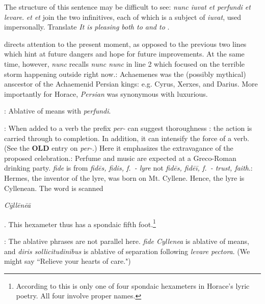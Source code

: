
The structure of this sentence may be difficult to see: \textit{nunc iuvat et perfundi et levare}.  \textit{et \lips et} join the two infinitives, each of which is a subject of \textit{iuvat}, used impersonally.  Translate \textit{It is pleasing both to \lips and to \lips}.


 directs attention to the present moment, as opposed to the previous two lines which hint at future dangers and hope for future improvements.  At the same time, however, \textit{nunc} recalls \textit{nunc \lips nunc} in line 2 which focused on the terrible storm happening outside right now.\indent{}: Achaemenes was the (possibly mythical) anscestor of the Achaemenid Persian kings: e.g. Cyrus, Xerxes, and Darius.  More importantly for Horace, \textit{Persian} was synonymous with luxurious.


: Ablative of means with \textit{perfundi}.


: When added to a verb the prefix \textit{per-} can suggest thoroughness : the action is carried through to completion.  In addition, it can intensify the force of a verb.  (See the \textbf{OLD} entry on \textit{per-}.)  Here it emphasizes the extravagance of the proposed celebration.\indent{}: Perfume and music are expected at a Greco-Roman drinking party.  \textit{fide} is from \textit{fidēs, fidis, f.\ - lyre} not  \textit{fidēs, fidēī, f.\ - trust, faith}.\indent{}:  Hermes, the inventor of the lyre, was born on Mt. Cyllene.  Hence, the lyre is Cyllenean.  The word is scanned \begin{metrica}\textit{C\=yll\=en\=e\=a}\end{metrica}.  This hexameter thus has a spondaic fifth foot.\footnote{According to \citet[220]{mankin1995} this is only one of four spondaic hexameters in Horace's lyric poetry.  All four involve proper names.}


: The ablative phrases are not parallel here.  \textit{fide Cyllenea} is ablative of means, and \textit{diris sollicitudinibus} is ablative of separation following \textit{levare pectora}.  (We might say ``Relieve your hearts of care.") 


